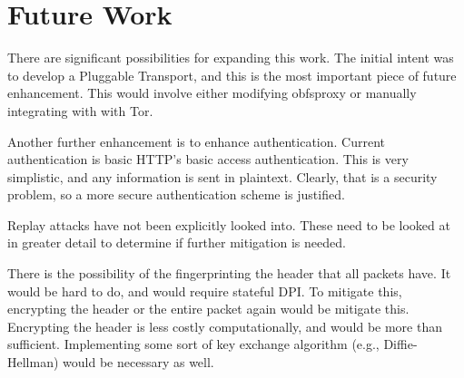 \section{Future Work}

There are significant possibilities for expanding this work. The initial intent was to develop a Pluggable Transport, and this is the most important piece of future enhancement. This would involve either modifying obfsproxy or manually integrating with with Tor.

Another further enhancement is to enhance authentication. Current authentication is basic HTTP's basic access authentication. This is very simplistic, and any information is sent in plaintext. Clearly, that is a security problem, so a more secure authentication scheme is justified.

Replay attacks have not been explicitly looked into. These need to be looked at in greater detail to determine if further mitigation is needed.

There is the possibility of the fingerprinting the header that all packets have. It would be hard to do, and would require stateful DPI. To mitigate this, encrypting the header or the entire packet again would be mitigate this. Encrypting the header is less costly computationally, and would be more than sufficient. Implementing some sort of key exchange algorithm (e.g., Diffie-Hellman) would be necessary as well.